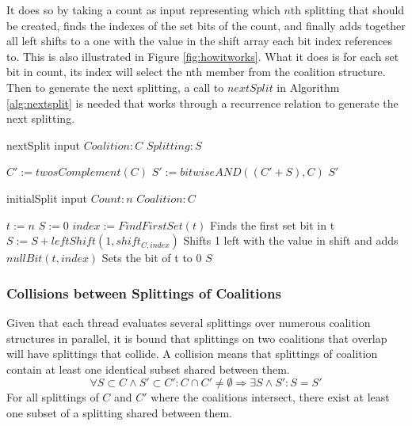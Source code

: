 \documentclass{llncs}
\begin{document}
It does so by taking a count as input representing which $n$th splitting that should be created, finds the indexes of the set bits of the count, and finally adds together all left shifts to a one with the value in the shift array each bit index references to. This is also illustrated in Figure \ref{fig:howitworks}. What it does is for each set bit in count, its index will select the nth member from the coalition structure. Then to generate the next splitting, a call to $nextSplit$ in Algorithm \ref{alg:nextsplit} is needed that works through a recurrence relation to generate the next splitting.

\begin{algorithm}
\caption{ nextSplit input $Coalition:C$ $Splitting:S$\label{alg:nextsplit}}
\begin{algorithmic}[1]
\STATE $C' := twosComplement(C)$
\STATE $S' := bitwiseAND((C'+S),C)$
\RETURN $S'$
\end{algorithmic}
\end{algorithm}

\begin{algorithm}
\caption{initialSplit input $Count:n$ $Coalition:C$\label{alg:initalsplit}}
\begin{algorithmic}[1]
\STATE $t := n$
\STATE $S := 0$
 { 
\STATE $index := FindFirstSet(t)$ \hfill Finds the first set bit in t
\STATE $S := S + leftShift(1,shift_{C,index})$ \hfill Shifts 1 left with the value in shift and adds
\STATE $nullBit(t,index)$ \hfill Sets the bit of t to 0
}
\ENDWHILE
\RETURN $S$
\end{algorithmic}
\end{algorithm}

\subsubsection{Collisions between Splittings of Coalitions} \label{sectionsplit}
Given that each thread evaluates several splittings over numerous coalition structures in parallel, 
it is bound that splittings on two coalitions that overlap will have splittings that collide.
A collision means that splittings of coalition contain at least one identical subset shared between them.
\begin{displaymath}\forall S\subset C \wedge S' \subset C' : C \cap C' \neq \emptyset \Rightarrow \exists S \wedge S' : S = S'\end{displaymath}
For all splittings of $C$ and $C'$ where the coalitions intersect, there exist at least one subset of a splitting shared between them.
\end{document}
